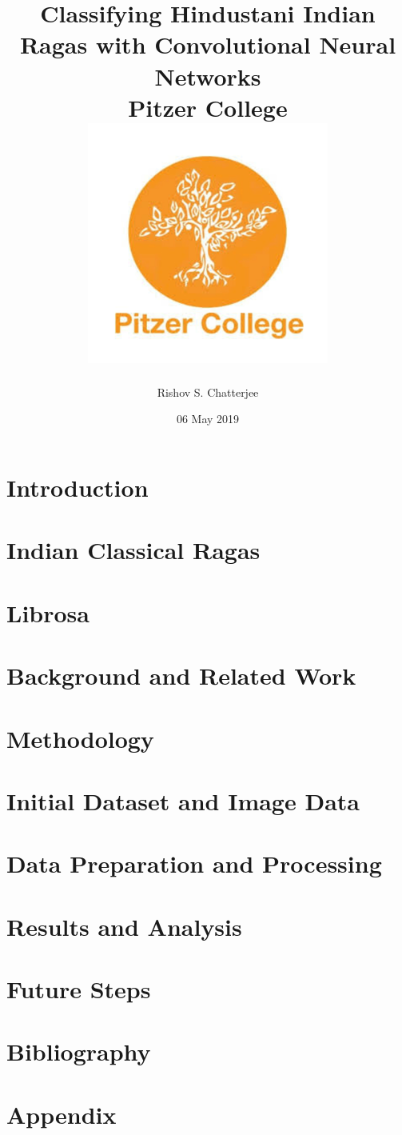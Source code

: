 \documentclass[12pt]{report}
\title{
{Classifying Hindustani Indian Ragas with Convolutional Neural Networks}\\
{\large Pitzer College}\\
{\includegraphics{university_1.png}}
}
\author{Rishov S. Chatterjee}
\date{06 May 2019}
\begin{document}
\maketitle{}
\chapter*{\centering Introduction}


\chapter*{\centering Indian Classical Ragas}


\chapter*{\centering Librosa}


\chapter*{\centering Background and Related Work}


\chapter*{\centering Methodology}


\chapter*{\centering Initial Dataset and Image Data}


\chapter*{\centering Data Preparation and Processing}


\chapter*{\centering Results and Analysis}


\chapter*{\centering Future Steps}


\chapter*{\centering Bibliography}


\chapter*{\centering Appendix}

\end{document}
